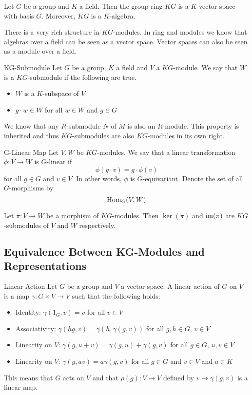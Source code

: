 \documentclass[a4paper]{article}
\begin{document}
\begin{lmm}{}{} Let $G$ be a group and $K$ a field. Then the group ring $KG$ is a $K$-vector space with basis $G$. Moreover, $KG$ is a $K$-algebra. 
\end{lmm}

There is a very rich structure in $KG$-modules. In ring and modules we know that algebras over a field can be seen as a vector space. Vector spaces can also be seen as a module over a field. 
\begin{defn}{KG-Submodule}{} Let $G$ be a group, $K$ a field and $V$ a $KG$-module. We say that $W$ is a $KG$-submodule if the following are true. 
\begin{itemize}
\item $W$ is a $K$-subspace of $V$
\item $g\cdot w\in W$ for all $w\in W$ and $g\in G$
\end{itemize}
\end{defn}

We know that any $R$-submodule $N$ of $M$ is also an $R$-module. This property is inherited and thus $KG$-submodules are also $KG$-modules in its own right. 

\begin{defn}{G-Linear Map}{} Let $V,W$ be $KG$-modules. We say that a linear transformation $\phi:V\to W$ is $G$-linear if $$\phi(g\cdot v)=g\cdot\phi(v)$$ for all $g\in G$ and $v\in V$. In other words, $\phi$ is $G$-equivariant. Denote the set of all $G$-morphisms by $$\operatorname{Hom}_G(V,W)$$
\end{defn}

\begin{lmm}{}{} Let $\pi:V\to W$ be a morphism of $KG$-modules. Then $\ker(\pi)$ and $\operatorname{im}(\pi)$ are $KG$-submodules of $V$ and $W$ respectively. 
\end{lmm}

\subsection{Equivalence Between KG-Modules and Representations}
\begin{defn}{Linear Action}{} Let $G$ be a group and $V$ a vector space. A linear action of $G$ on $V$ is a map $\gamma:G\times V\to V$ such that the following holds: 
\begin{itemize}
\item Identity: $\gamma(1_G,v)=v$ for all $v\in V$
\item Associativity: $\gamma(hg,v)=\gamma(h,\gamma(g,v))$ for all $g,h\in G$, $v\in V$
\item Linearity on $V$: $\gamma(g,u+v)=\gamma(g,u)+\gamma(g,v)$ for all $g\in G$, $u,v\in V$
\item Linearity on $V$: $\gamma(g,av)=a\gamma(g,v)$ for all $g\in G$ and $v\in V$ and $a\in K$
\end{itemize}
This means that $G$ acts on $V$ and that $\rho(g):V\to V$ defined by $v\mapsto\gamma(g,v)$ is a linear map. 
\end{defn}
\end{document}
